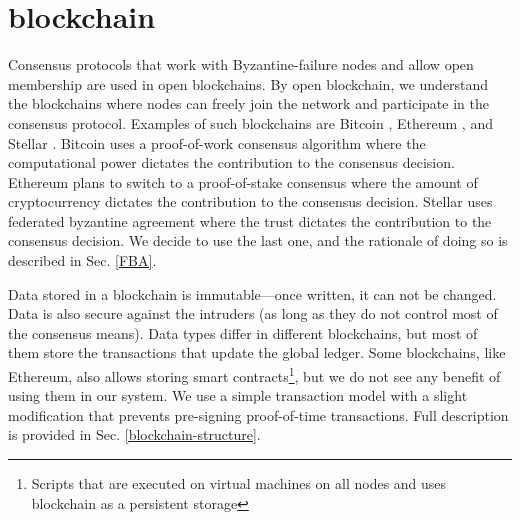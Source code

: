 
\chapter{blockchain}
\label{blockchain}
Consensus protocols that work with Byzantine-failure nodes and allow open membership are used in open blockchains. By open blockchain, we understand the blockchains where nodes can freely join the network and participate in the consensus protocol. Examples of such blockchains are Bitcoin \cite{nakamoto2008peer}, Ethereum \cite{wood2014ethereum}, and Stellar \cite{mazieres2015stellar}. Bitcoin uses a proof-of-work consensus algorithm where the computational power dictates the contribution to the consensus decision. Ethereum plans to switch to a proof-of-stake consensus where the amount of cryptocurrency dictates the contribution to the consensus decision. Stellar uses federated byzantine agreement where the trust dictates the contribution to the consensus decision. We decide to use the last one, and the rationale of doing so is described in Sec. \ref{FBA}.

Data stored in a blockchain is immutable––once written, it can not be changed. Data is also secure against the intruders (as long as they do not control most of the consensus means). Data types differ in different blockchains, but most of them store the transactions that update the global ledger. Some blockchains, like Ethereum, also allows storing smart contracts\footnote{Scripts that are executed on virtual machines on all nodes and uses blockchain as a persistent storage}, but we do not see any benefit of using them in our system. We use a simple transaction model with a slight modification that prevents pre-signing proof-of-time transactions. Full description is provided in Sec. \ref{blockchain-structure}.


